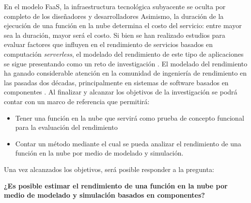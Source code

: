 En el modelo FaaS, la infraestructura tecnológica subyacente se oculta por completo de los diseñadores y desarrolladores Asimismo, la duración de la ejecución de una función en la nube determina el costo del servicio: entre mayor sea la duración, mayor será el costo. Si bien se han realizado estudios \cite{8360324} para evaluar factores que influyen en el rendimiento de servicios basados en computación \emph{serverless}, el modelado del rendimiento de este tipo de aplicaciones se sigue presentando como un reto de investigación \cite{Heinrich:2017:PEM:3053600.3053653}. El modelado del rendimiento ha ganado considerable atención en la comunidad de ingeniería de rendimiento en las pasadas dos décadas, principalmente en sistemas de software basados en componentes \cite{Koziolek:2010:PEC:1808359.1808729}. Al finalizar y alcanzar los objetivos de la investigación se podrá contar con un marco de referencia que permitirá:
\begin{itemize}
    \item Tener una función en la nube que servirá como prueba de concepto funcional para la evaluación del rendimiento
    \item Contar un método mediante el cual se pueda analizar el rendimiento de una función en la nube por medio de modelado y simulación.
\end{itemize}


Una vez alcanzados los objetivos, será posible responder a la pregunta:


\textbf{¿Es posible estimar el rendimiento de una función en la nube por medio de modelado y simulación basados en componentes?}